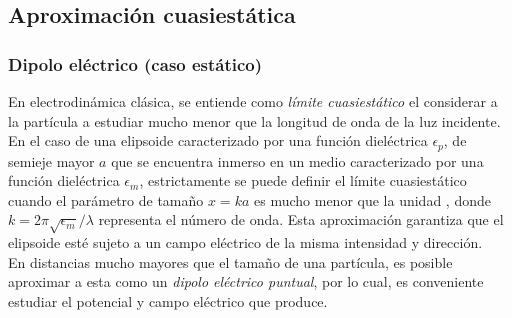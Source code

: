 \subsection{Aproximación cuasiestática}
\subsubsection{Dipolo eléctrico (caso estático)}

En electrodinámica clásica, se entiende como \textit{límite cuasiestático} el considerar a la partícula a estudiar mucho menor que la longitud de onda de la luz incidente. \cite{Cuasiest} En el caso de una elipsoide caracterizado por una función dieléctrica $\epsilon_p$, de semieje mayor $a$ que se encuentra inmerso en un medio caracterizado por una función dieléctrica $\epsilon_m$, estrictamente se puede definir el límite cuasiestático cuando el parámetro de tamaño $x=ka$ es mucho menor que la unidad \cite{Bohren}, donde $k=2\pi \sqrt{\epsilon_m}/\lambda$ representa el número de onda. Esta aproximación garantiza que el elipsoide esté sujeto a un campo eléctrico de la misma intensidad y dirección. \cite{Miguel}\\


En distancias mucho mayores que el tamaño de una partícula, es posible aproximar a esta como un \textit{dipolo eléctrico puntual}, por lo cual, es conveniente estudiar el potencial y campo eléctrico que produce.\\

